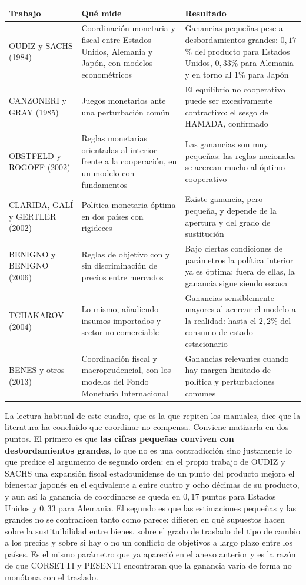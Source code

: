 \documentclass[10pt,a4paper]{article}
\newcounter{anexo}
\begin{document}
\begin{center}
{\small
\begin{tabular}{p{3.5cm} p{5.0cm} p{6.0cm}}
\hline
\textbf{Trabajo} & \textbf{Qué mide} & \textbf{Resultado}\\
\hline
OUDIZ y SACHS (1984) & Coordinación monetaria y fiscal entre Estados Unidos, Alemania y Japón, con modelos econométricos & Ganancias pequeñas pese a desbordamientos grandes: $0{,}17$\% del producto para Estados Unidos, $0{,}33$\% para Alemania y en torno al $1$\% para Japón\\[0.5em]
CANZONERI y GRAY (1985) & Juegos monetarios ante una perturbación común & El equilibrio no cooperativo puede ser excesivamente contractivo: el sesgo de HAMADA, confirmado\\[0.5em]
OBSTFELD y ROGOFF (2002) & Reglas monetarias orientadas al interior frente a la cooperación, en un modelo con fundamentos & Las ganancias son muy pequeñas: las reglas nacionales se acercan mucho al óptimo cooperativo\\[0.5em]
CLARIDA, GALÍ y GERTLER (2002) & Política monetaria óptima en dos países con rigideces & Existe ganancia, pero pequeña, y depende de la apertura y del grado de sustitución\\[0.5em]
BENIGNO y BENIGNO (2006) & Reglas de objetivo con y sin discriminación de precios entre mercados & Bajo ciertas condiciones de parámetros la política interior ya es óptima; fuera de ellas, la ganancia sigue siendo escasa\\[0.5em]
TCHAKAROV (2004) & Lo mismo, añadiendo insumos importados y sector no comerciable & Ganancias sensiblemente mayores al acercar el modelo a la realidad: hasta el $2{,}2$\% del consumo de estado estacionario\\[0.5em]
BENES y otros (2013) & Coordinación fiscal y macroprudencial, con los modelos del Fondo Monetario Internacional & Ganancias relevantes cuando hay margen limitado de política y perturbaciones comunes\\
\hline
\end{tabular}}
\end{center}

La lectura habitual de este cuadro, que es la que repiten los manuales, dice que la literatura ha concluido que coordinar no compensa. Conviene matizarla en dos puntos. El primero es que \textbf{las cifras pequeñas conviven con desbordamientos grandes}, lo que no es una contradicción sino justamente lo que predice el argumento de segundo orden: en el propio trabajo de OUDIZ y SACHS una expansión fiscal estadounidense de un punto del producto mejora el bienestar japonés en el equivalente a entre cuatro y ocho décimas de su producto, y aun así la ganancia de coordinarse se queda en $0{,}17$ puntos para Estados Unidos y $0{,}33$ para Alemania. El segundo es que las estimaciones pequeñas y las grandes no se contradicen tanto como parece: difieren en qué supuestos hacen sobre la sustituibilidad entre bienes, sobre el grado de traslado del tipo de cambio a los precios y sobre si hay o no un conflicto de objetivos a largo plazo entre los países. Es el mismo parámetro que ya apareció en el anexo anterior y es la razón de que CORSETTI y PESENTI encontraran que la ganancia varía de forma no monótona con el traslado.
\end{document}
